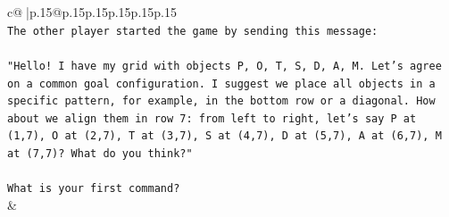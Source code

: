 \documentclass{article}
\begin{document}
{\begin{supertabular}{c@{$\;$}|p{.15\linewidth}@{}p{.15\linewidth}p{.15\linewidth}p{.15\linewidth}p{.15\linewidth}p{.15\linewidth}}
{{{\\ 
\texttt{The other player started the game by sending this message:} \\
\\ 
\texttt{"Hello! I have my grid with objects P, O, T, S, D, A, M. Let's agree on a common goal configuration. I suggest we place all objects in a specific pattern, for example, in the bottom row or a diagonal. How about we align them in row 7: from left to right, let's say P at (1,7), O at (2,7), T at (3,7), S at (4,7), D at (5,7), A at (6,7), M at (7,7)? What do you think?"} \\
\\ 
\texttt{What is your first command?} \\
            }
        }
    }
    & \\ \\


\end{supertabular}}
\end{document}
